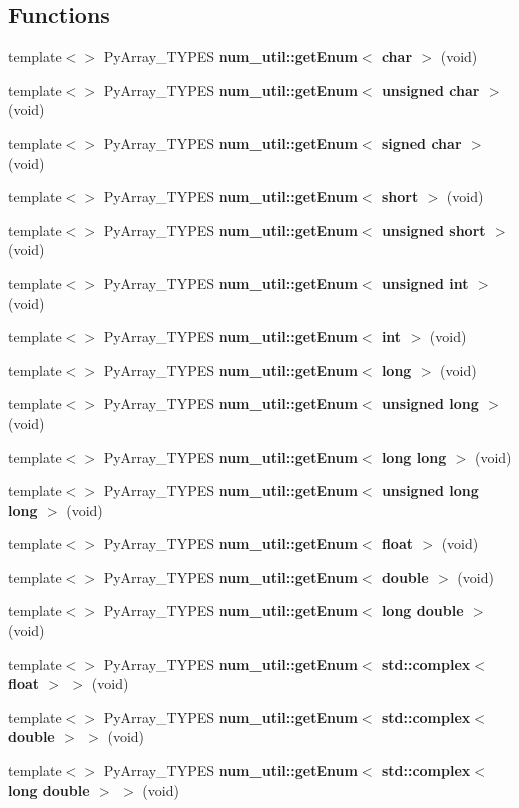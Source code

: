 \subsection*{Functions}
\begin{CompactItemize}
\item 
template$<$$>$ Py\-Array\_\-TYPES {\bf num\_\-util::get\-Enum$<$ char $>$} (void)
\item 
template$<$$>$ Py\-Array\_\-TYPES {\bf num\_\-util::get\-Enum$<$ unsigned char $>$} (void)
\item 
template$<$$>$ Py\-Array\_\-TYPES {\bf num\_\-util::get\-Enum$<$ signed char $>$} (void)
\item 
template$<$$>$ Py\-Array\_\-TYPES {\bf num\_\-util::get\-Enum$<$ short $>$} (void)
\item 
template$<$$>$ Py\-Array\_\-TYPES {\bf num\_\-util::get\-Enum$<$ unsigned short $>$} (void)
\item 
template$<$$>$ Py\-Array\_\-TYPES {\bf num\_\-util::get\-Enum$<$ unsigned int $>$} (void)
\item 
template$<$$>$ Py\-Array\_\-TYPES {\bf num\_\-util::get\-Enum$<$ int $>$} (void)
\item 
template$<$$>$ Py\-Array\_\-TYPES {\bf num\_\-util::get\-Enum$<$ long $>$} (void)
\item 
template$<$$>$ Py\-Array\_\-TYPES {\bf num\_\-util::get\-Enum$<$ unsigned long $>$} (void)
\item 
template$<$$>$ Py\-Array\_\-TYPES {\bf num\_\-util::get\-Enum$<$ long long $>$} (void)
\item 
template$<$$>$ Py\-Array\_\-TYPES {\bf num\_\-util::get\-Enum$<$ unsigned long long $>$} (void)
\item 
template$<$$>$ Py\-Array\_\-TYPES {\bf num\_\-util::get\-Enum$<$ float $>$} (void)
\item 
template$<$$>$ Py\-Array\_\-TYPES {\bf num\_\-util::get\-Enum$<$ double $>$} (void)
\item 
template$<$$>$ Py\-Array\_\-TYPES {\bf num\_\-util::get\-Enum$<$ long double $>$} (void)
\item 
template$<$$>$ Py\-Array\_\-TYPES {\bf num\_\-util::get\-Enum$<$ std::complex$<$ float $>$ $>$} (void)
\item 
template$<$$>$ Py\-Array\_\-TYPES {\bf num\_\-util::get\-Enum$<$ std::complex$<$ double $>$ $>$} (void)
\item 
template$<$$>$ Py\-Array\_\-TYPES {\bf num\_\-util::get\-Enum$<$ std::complex$<$ long double $>$ $>$} (void)
\item 
$$
\end{CompactItemize}
